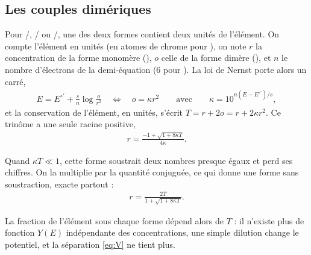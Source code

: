 \documentclass[a4paper,11pt]{article}
\newcommand\Lra{\Longleftrightarrow}
\begin{document}
\subsection{Les couples dimériques}
Pour /, / ou /, une des deux formes contient deux unités de l'élément.
On compte l'élément en unités (en atomes de chrome pour ), on note $r$ la concentration de la forme monomère (), $o$ celle de la forme dimère (), et $n$ le nombre d'électrons de la demi-équation (6 pour ).
La loi de Nernst porte alors un carré,
\begin{align}
E=E^{\circ\prime}+\frac sn\log\frac o{r^2}
\quad\Lra\quad
o=\kappa r^2
\qquad\text{avec}\qquad
\kappa=10^{n(E-E^{\circ\prime})/s},
\end{align}
et la conservation de l'élément, en unités, s'écrit $T=r+2o=r+2\kappa r^2$.
Ce trinôme a une seule racine positive,
\begin{align}
r=\frac{-1+\sqrt{1+8\kappa T}}{4\kappa}.
\end{align}
\begin{algo}
Quand $\kappa T\ll1$, cette forme soustrait deux nombres presque égaux et perd ses chiffres.
On la multiplie par la quantité conjuguée, ce qui donne une forme sans soustraction, exacte partout :
\begin{align}
r=\frac{2T}{1+\sqrt{1+8\kappa T}}.
\end{align}
\end{algo}
La fraction de l'élément sous chaque forme dépend alors de $T$ : il n'existe plus de fonction $Y(E)$ indépendante des concentrations, une simple dilution change le potentiel, et la séparation \eqref{eq:V} ne tient plus.
\end{document}
